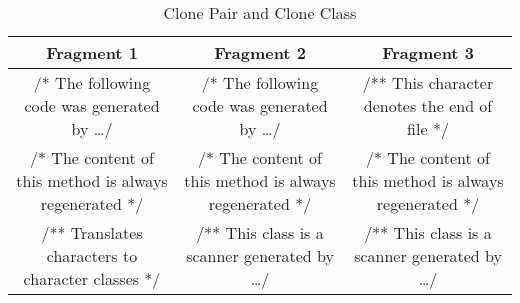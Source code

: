 \setlength{\extrarowheight}{.5em}
\begin{table}
	\caption{Clone Pair and Clone Class}
	\label{table:cloneClass}

%		
%		
	\begin{tabularx}{1.0\textwidth}{C|C|C}
		\textbf{Fragment 1} & \textbf{Fragment 2} & \textbf{Fragment 3} \\
		\hline
		
		/* The following code was generated by \dots */ &
		/* The following code was generated by \dots */ &
		/** This character denotes the end of file */ \\
		\hline
				
		/* The content of this method is always regenerated */ &
		/* The content of this method is always regenerated */ &
		/* The content of this method is always regenerated */ \\
		\hline
		
		/** Translates characters to character classes */ &
		 /** This class is a scanner generated by \dots */ &
		 /** This class is a scanner generated by \dots */ \\
	\end{tabularx}
\end{table}